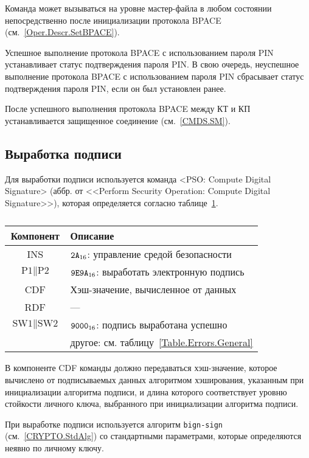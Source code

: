 Команда может вызываться на уровне мастер-файла в любом состоянии
непосредственно после инициализации протокола 
BPACE (см.~\ref{Oper.Descr.SetBPACE}).

Успешное выполнение протокола BPACE с использованием пароля PIN 
устанавливает статус подтверждения пароля PIN.
В свою очередь, неуспешное выполнение протокола BPACE с использованием 
пароля PIN сбрасывает статус подтверждения пароля PIN, 
если он был установлен ранее.

После успешного выполнения протокола BPACE между КТ и КП 
устанавливается защищенное соединение (см.~\ref{CMDS.SM}).


\subsection{Выработка подписи}
\label{Oper.Descr.Signature}

Для выработки подписи используется 
команда <PSO: Compute Digital Signature>
(аббр. от <<Perform Security Operation: Compute Digital Signature>>),
которая определяется согласно 
таблице~\ref{Table.Oper.SignatureCmd}.

\begin{table}[hbt]
\caption{}\label{Table.Oper.SignatureCmd}
\begin{tabular}{|c|p{14cm}|}
\hline
Компонент & Описание\\ 
\hline
\hline
INS & $\texttt{2A}_{16}$: управление средой безопасности \\
\hline
$\text{P1} \parallel \text{P2}$ & $\texttt{9E9A}_{16}$: выработать
электронную подпись \\ 
\hline
CDF & Хэш-значение, вычисленное от данных\\
\hline 
RDF &  --- \\
\hline
$\text{SW1} \parallel \text{SW2}$ & 
  $\texttt{9000}_{16}$: подпись выработана успешно \\
  & другое: см. таблицу~\ref{Table.Errors.General} \\
\hline
\end{tabular}
\end{table}

В компоненте CDF команды должно передаваться хэш-значение, которое вычислено
от подписываемых данных алгоритмом хэширования, указанным 
при инициализации алгоритма подписи, и длина которого соответствует
уровню стойкости личного ключа, выбранного при инициализации алгоритма подписи.

При выработке подписи используется алгоритм \texttt{bign-sign}
(см.~\ref{CRYPTO.StdAlg}) со стандартными параметрами, 
которые определяются неявно по личному ключу.  

